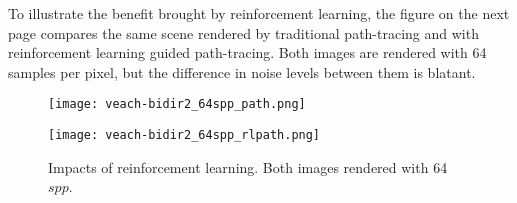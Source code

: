 To illustrate the benefit brought by reinforcement learning, the figure on the next page compares the same scene rendered by traditional path-tracing and with reinforcement learning guided path-tracing. Both images are rendered with 64 samples per pixel, but the difference in noise levels between them is blatant. 

\begin{figure}[H]
    \centering
    
    \begin{minipage}[t]{.99\textwidth}
        \centering
        \vspace{0pt}
        \texttt{[image: veach-bidir2\_64spp\_path.png]}
    \end{minipage}
    
    \vspace{0.3cm}

    \begin{minipage}[t]{.99\textwidth}
        \centering
        \vspace{0pt}
        \texttt{[image: veach-bidir2\_64spp\_rlpath.png]}
    \end{minipage}
    
    \caption{Impacts of reinforcement learning. Both images rendered with 64 $spp$.}
    \label{fig RL comparison}
\end{figure}